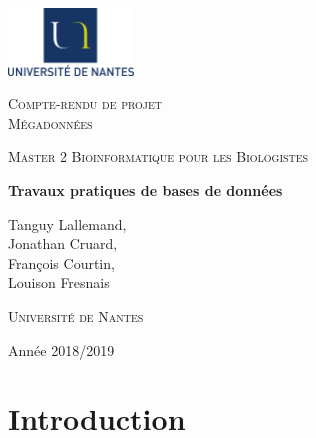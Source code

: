 \documentclass[11pt,a4paper]{article}
\begin{document}
\begin{titlepage}
    \centering
	\includegraphics[width=0.25\textwidth]{img/logo.png}
	\par\vspace{1cm}
	\vspace{1cm}
	{\scshape\Large Compte-rendu de projet \\ Mégadonnées \par}
	\vspace{0.5cm}
	{\scshape\large Master 2 Bioinformatique pour les Biologistes\par}
	\vspace{1.5cm}
	{\LARGE\bfseries Travaux pratiques de bases de données\par}
	\vspace{2cm}
	{\Large Tanguy Lallemand, \\
            Jonathan Cruard, \\
            François Courtin, \\
            Louison Fresnais\par}
	\vfill

    {\scshape\Large Université de Nantes \par}
    \vspace{1.5cm}
	{\large Année 2018/2019 \par}
\end{titlepage}

\newpage
\tableofcontents
\newpage

\section{Introduction}
\end{document}
